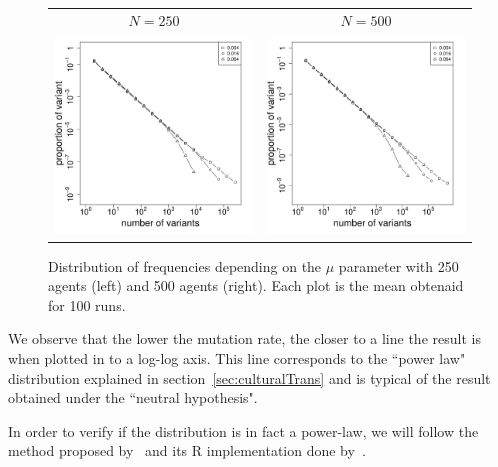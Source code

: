 \documentclass{wscpaperproc}
\begin{document}
\begin{figure}[h]
	\centering
	\begin{tabular}{ c c}
		 $N=250$ & $N=500$ \\
		\includegraphics[width=6cm]{img/allmuRandMaxN250.pdf}&
		\includegraphics[width=6cm]{img/allmuRandMaxN500.pdf}
	\end{tabular}
	\caption{Distribution of frequencies depending on the $\mu$ parameter with 250 agents (left) and 500 agents (right). Each plot is the mean obtenaid for 100 runs.\label{fig:allMutation}}
\end{figure}

We observe that the lower the mutation rate, the closer to a line the result is when plotted in to a log-log axis. This line corresponds to the ``power law" distribution explained in section~\ref{sec:culturalTrans} and is typical of the result obtained under the ``neutral hypothesis". 


In order to verify if the distribution is in fact a power-law, we will follow the method proposed by~\cite{clauset2009powerlawdistributionsinempiricaldat} and its R implementation done by~\cite{gillespie_fitting_2015}.
\end{document}
